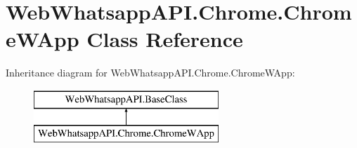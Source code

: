 \hypertarget{class_web_whatsapp_a_p_i_1_1_chrome_1_1_chrome_w_app}{}\section{Web\+Whatsapp\+A\+P\+I.\+Chrome.\+Chrome\+W\+App Class Reference}
\label{class_web_whatsapp_a_p_i_1_1_chrome_1_1_chrome_w_app}
Inheritance diagram for Web\+Whatsapp\+A\+P\+I.\+Chrome.\+Chrome\+W\+App\+:\begin{figure}[H]
\begin{center}
\leavevmode
\includegraphics[height=2.000000cm]{class_web_whatsapp_a_p_i_1_1_chrome_1_1_chrome_w_app}
\end{center}
\end{figure}
